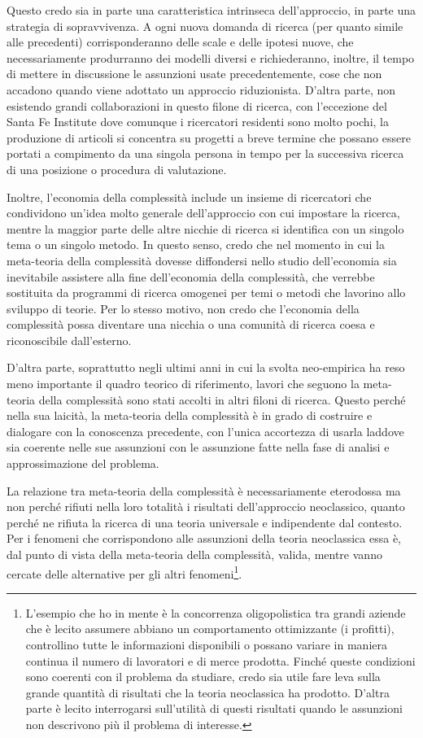 \documentclass[a4paper, headings=standardclasses]{scrartcl}
\begin{document}
Questo credo sia in parte una caratteristica intrinseca dell'approccio, in parte una strategia di sopravvivenza.
A ogni nuova domanda di ricerca (per quanto simile alle precedenti) corrisponderanno delle scale e delle ipotesi nuove, che necessariamente produrranno dei modelli diversi e richiederanno, inoltre, il tempo di mettere in discussione le assunzioni usate precedentemente, cose che non accadono quando viene adottato un approccio riduzionista.
D'altra parte, non esistendo grandi collaborazioni in questo filone di ricerca, con l'eccezione del Santa Fe Institute dove comunque i ricercatori residenti sono molto pochi, la produzione di articoli si concentra su progetti a breve termine che possano essere portati a compimento da una singola persona in tempo per la successiva ricerca di una posizione o procedura di valutazione.

Inoltre, l'economia della complessità include un insieme di ricercatori che condividono un'idea molto generale dell'approccio con cui impostare la ricerca, mentre la maggior parte delle altre nicchie di ricerca si identifica con un singolo tema o un singolo metodo.
In questo senso, credo che nel momento in cui la meta-teoria della complessità dovesse diffondersi nello studio dell'economia sia inevitabile assistere alla fine dell'economia della complessità, che verrebbe sostituita da programmi di ricerca omogenei per temi o metodi che lavorino allo sviluppo di teorie.
Per lo stesso motivo, non credo che l'economia della complessità possa diventare una nicchia o una comunità di ricerca coesa e riconoscibile dall'esterno.

D'altra parte, soprattutto negli ultimi anni in cui la svolta neo-empirica ha reso meno importante il quadro teorico di riferimento, lavori che seguono la meta-teoria della complessità sono stati accolti in altri filoni di ricerca.
Questo perché nella sua laicità, la meta-teoria della complessità è in grado di costruire e dialogare con la conoscenza precedente, con l'unica accortezza di usarla laddove sia coerente nelle sue assunzioni con le assunzione fatte nella fase di analisi e approssimazione del problema.

La relazione tra meta-teoria della complessità è necessariamente eterodossa \parencite{fontana2010} ma non perché rifiuti nella loro totalità i risultati dell'approccio neoclassico, quanto perché ne rifiuta la ricerca di una teoria universale e indipendente dal contesto.
Per i fenomeni che corrispondono alle assunzioni della teoria neoclassica essa è, dal punto di vista della meta-teoria della complessità, valida, mentre vanno cercate delle alternative per gli altri fenomeni\footnote{L'esempio che ho in mente è la concorrenza oligopolistica tra grandi aziende che è lecito assumere abbiano un comportamento ottimizzante (i profitti), controllino tutte le informazioni disponibili o possano variare in maniera continua il numero di lavoratori e di merce prodotta. Finché queste condizioni sono coerenti con il problema da studiare, credo sia utile fare leva sulla grande quantità di risultati che la teoria neoclassica ha prodotto. D'altra parte è lecito interrogarsi sull'utilità di questi risultati quando le assunzioni non descrivono più il problema di interesse.}.
\end{document}
